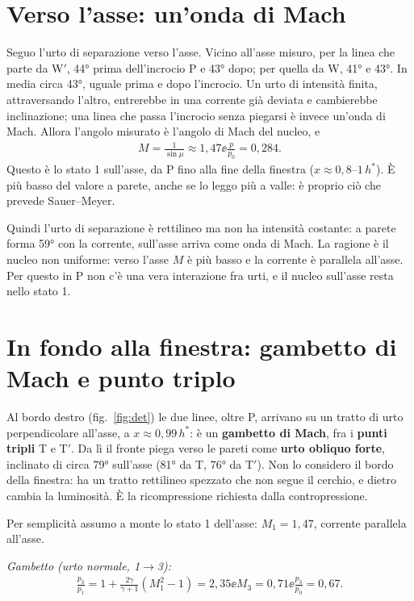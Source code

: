 \section*{Verso l'asse: un'onda di Mach}
Seguo l'urto di separazione verso l'asse. Vicino all'asse misuro, per la linea che parte da W$'$, \ang{44} prima
dell'incrocio P e \ang{43} dopo; per quella da W, \ang{41} e \ang{43}. In media circa \ang{43}, uguale prima e
dopo l'incrocio. Un urto di intensità finita, attraversando l'altro, entrerebbe
in una corrente già deviata e cambierebbe inclinazione; una linea che passa l'incrocio senza piegarsi è invece
un'onda di Mach. Allora l'angolo misurato è l'angolo di Mach del nucleo, e
\begin{gather*}
M=\frac{1}{\sin\mu}\approx1{,}47 \ee \frac{p}{p_0}=0{,}284 .
\end{gather*}
Questo è lo stato 1 sull'asse, da P fino alla fine della finestra ($x\approx0{,}8$--$1\,h^*$). È più basso del valore
a parete, anche se lo leggo più a valle: è proprio ciò che prevede Sauer--Meyer.

Quindi l'urto di separazione è rettilineo ma non ha intensità costante: a parete forma \ang{59} con la corrente,
sull'asse arriva come onda di Mach. La ragione è il nucleo non uniforme: verso l'asse $M$ è più basso e la corrente
è parallela all'asse. Per questo in P non c'è una vera interazione fra urti, e il nucleo sull'asse resta nello
stato 1.

\section*{In fondo alla finestra: gambetto di Mach e punto triplo}
Al bordo destro (fig.~\ref{fig:det}) le due linee, oltre P, arrivano su un tratto di urto perpendicolare all'asse, a
$x\approx0{,}99\,h^*$: è un \textbf{gambetto di Mach}, fra i \textbf{punti tripli} T e T$'$. Da lì il fronte piega
verso le pareti come \textbf{urto obliquo forte}, inclinato di circa \ang{79} sull'asse (\ang{81} da T, \ang{76} da
T$'$). Non lo considero il bordo della finestra: ha un tratto rettilineo spezzato che non segue il cerchio, e dietro
cambia la luminosità. È la ricompressione richiesta dalla contropressione.

Per semplicità assumo a monte lo stato 1 dell'asse: $M_1=1{,}47$, corrente parallela all'asse.

\emph{Gambetto (urto normale, 1$\to$3):}
\begin{gather*}
\frac{p_3}{p_1}=1+\frac{2\gamma}{\gamma+1}\left(M_1^2-1\right)=2{,}35 \ee M_3=0{,}71 \ee \frac{p_3}{p_0}=0{,}67 .
\end{gather*}


